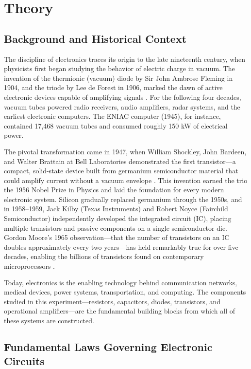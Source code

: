 \section{Theory}
\subsection*{Background and Historical Context}

The discipline of electronics traces its origin to the late nineteenth century, when
physicists first began studying the behavior of electric charge in vacuum. The invention
of the thermionic (vacuum) diode by Sir John Ambrose Fleming in 1904, and the triode by
Lee de Forest in 1906, marked the dawn of active electronic devices capable of amplifying
signals \cite{horowitz2015}. For the following four decades, vacuum tubes powered radio
receivers, audio amplifiers, radar systems, and the earliest electronic computers. The
ENIAC computer (1945), for instance, contained 17,468 vacuum tubes and consumed roughly
150 kW of electrical power.

The pivotal transformation came in 1947, when William Shockley, John Bardeen, and Walter
Brattain at Bell Laboratories demonstrated the first transistor---a compact, solid-state
device built from germanium semiconductor material that could amplify current without a
vacuum envelope \cite{razavi2013}. This invention earned the trio the 1956 Nobel Prize in
Physics and laid the foundation for every modern electronic system. Silicon gradually
replaced germanium through the 1950s, and in 1958--1959, Jack Kilby (Texas Instruments)
and Robert Noyce (Fairchild Semiconductor) independently developed the integrated circuit
(IC), placing multiple transistors and passive components on a single semiconductor die.
Gordon Moore's 1965 observation---that the number of transistors on an IC doubles
approximately every two years---has held remarkably true for over five decades, enabling
the billions of transistors found on contemporary microprocessors \cite{sedra2020}.

Today, electronics is the enabling technology behind communication networks, medical
devices, power systems, transportation, and computing. The components studied in this
experiment---resistors, capacitors, diodes, transistors, and operational amplifiers---are
the fundamental building blocks from which all of these systems are constructed.

\subsection*{Fundamental Laws Governing Electronic Circuits}

